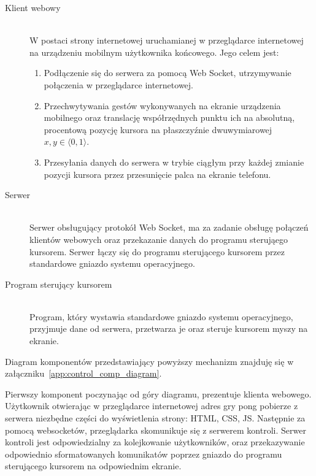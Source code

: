\begin{description}
  \item[Klient webowy] \hfill \\
  W postaci strony internetowej uruchamianej w przeglądarce internetowej na urządzeniu mobilnym użytkownika końcowego. Jego celem jest:
  \begin{enumerate}
    \item Podłączenie się do serwera za pomocą Web Socket, utrzymywanie połączenia w przeglądarce internetowej.
    \item Przechwytywania gestów wykonywanych na ekranie urządzenia mobilnego oraz translację współrzędnych punktu ich na absolutną, procentową pozycję kursora na płaszczyźnie dwuwymiarowej \( x, y \in \langle0, 1\rangle \).
    \item Przesyłania danych do serwera w trybie ciągłym przy każdej zmianie pozycji kursora przez przesunięcie palca na ekranie telefonu.
  \end{enumerate}
 
 \item[Serwer] \hfill \\
 Serwer obsługujący protokół Web Socket, ma za zadanie obsługę połączeń klientów webowych oraz przekazanie danych do programu sterująego kursorem. Serwer łączy się do programu sterującego kursorem przez standardowe gniazdo systemu operacyjnego.
 
 \item[Program sterujący kursorem] \hfill \\
 Program, który wystawia standardowe gniazdo systemu operacyjnego, przyjmuje dane od serwera, przetwarza je oraz steruje kursorem myszy na ekranie.
\end{description}

Diagram komponentów przedstawiający powyższy mechanizm znajduję się w załączniku~\ref{app:control_comp_diagram}.

\par

Pierwszy komponent poczynając od góry diagramu, prezentuje klienta webowego. Użytkownik otwierając w przeglądarce internetowej adres gry pong pobierze z serwera niezbędne części do wyświetlenia strony: HTML, CSS, JS. Następnie za pomocą websocketów, przeglądarka skomunikuje się z serwerem kontroli. Serwer kontroli jest odpowiedzialny za kolejkowanie użytkowników, oraz przekazywanie odpowiednio sformatowanych komunikatów poprzez gniazdo do programu sterującego kursorem na odpowiednim ekranie.

